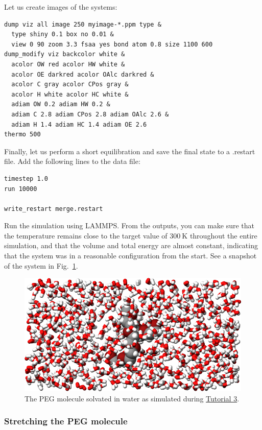 \documentclass[9pt,tutorial]{livecoms}
\newcommand{\lmpcmd}[1]{\hspace{0pt}\colorbox{listing}{\textcolor{command}{\small{#1}}}\hspace{0pt}} %
\begin{document}
Let us create images of the systems:
\begin{lstlisting}
dump viz all image 250 myimage-*.ppm type &
  type shiny 0.1 box no 0.01 &
  view 0 90 zoom 3.3 fsaa yes bond atom 0.8 size 1100 600
dump_modify viz backcolor white &
  acolor OW red acolor HW white &
  acolor OE darkred acolor OAlc darkred &
  acolor C gray acolor CPos gray &
  acolor H white acolor HC white &
  adiam OW 0.2 adiam HW 0.2 &
  adiam C 2.8 adiam CPos 2.8 adiam OAlc 2.6 &
  adiam H 1.4 adiam HC 1.4 adiam OE 2.6
thermo 500
\end{lstlisting}
Finally, let us perform a short equilibration and save the
final state to a \lmpcmd{.restart} file.  Add the following lines to the data file:
\begin{lstlisting}
timestep 1.0
run 10000

write_restart merge.restart
\end{lstlisting}
Run the simulation using LAMMPS.  From the outputs, you can make
sure that the temperature remains close to the
target value of $300~\text{K}$ throughout the entire simulation, and that
the volume and total energy are almost constant, indicating
that the system was in a reasonable configuration from the start.
See a snapshot of the system in Fig.~\ref{fig:PEG-solvated}.

\begin{figure}
\centering
\includegraphics[width=\linewidth]{PEG-solvated}
\caption{The PEG molecule solvated in water as simulated during
\hyperref[all-atom-label]{Tutorial 3}.}
\label{fig:PEG-solvated}
\end{figure}

\subsubsection{Stretching the PEG molecule}
\end{document}
